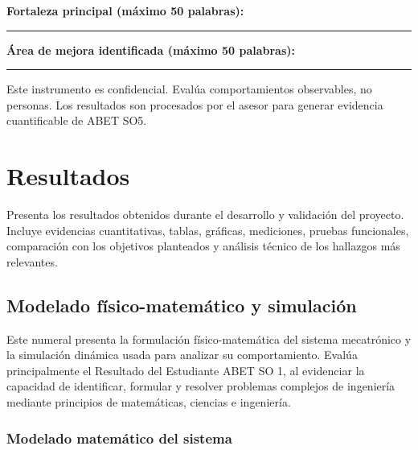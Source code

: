 \documentclass[12pt,letterpaper]{report}
\begin{document}
\begin{instrucciones}
\noindent \textbf{Fortaleza principal (máximo 50 palabras):}

\noindent\rule{\textwidth}{0.4pt}

\vspace{2mm}
\noindent \textbf{Área de mejora identificada (máximo 50 palabras):}

\noindent\rule{\textwidth}{0.4pt}

\begin{advertenciaABET}
Este instrumento es confidencial. Evalúa comportamientos observables, no personas. Los resultados son procesados por el asesor para generar evidencia cuantificable de ABET SO5.
\end{advertenciaABET}

\end{instrucciones}

\chapter{Resultados}

\begin{instrucciones}
Presenta los resultados obtenidos durante el desarrollo y validación del proyecto. Incluye evidencias cuantitativas, tablas, gráficas, mediciones, pruebas funcionales, comparación con los objetivos planteados y análisis técnico de los hallazgos más relevantes.
\end{instrucciones}

\section{Modelado físico-matemático y simulación}

\begin{instrucciones}
Este numeral presenta la formulación físico-matemática del sistema mecatrónico y la simulación dinámica usada para analizar su comportamiento. Evalúa principalmente el Resultado del Estudiante ABET SO 1, al evidenciar la capacidad de identificar, formular y resolver problemas complejos de ingeniería mediante principios de matemáticas, ciencias e ingeniería.
\end{instrucciones}

\subsection{Modelado matemático del sistema}
\end{document}
